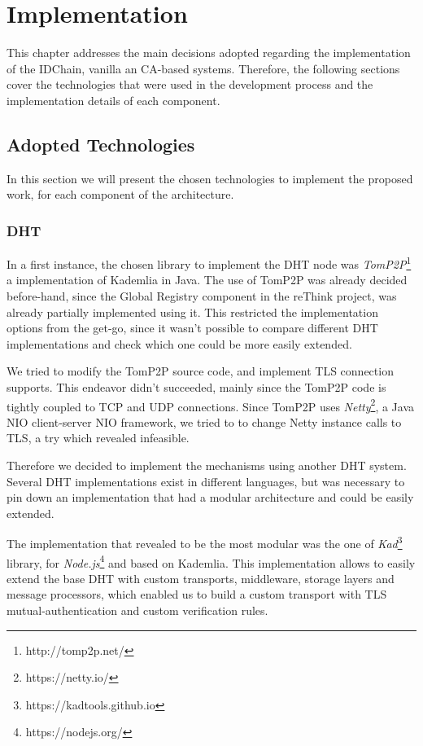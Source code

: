 \chapter{Implementation}
\label{chapter:implementation}

This chapter addresses the main decisions adopted regarding the implementation of the IDChain, vanilla an CA-based systems. Therefore, the following sections cover the technologies that were used in the development process and the implementation details of each component.

\section{Adopted Technologies}

In this section we will present the chosen technologies to implement the proposed work, for each component of the architecture.

\subsection{DHT}

In a first instance, the chosen library to implement the DHT node was \textit{TomP2P}\footnote{http://tomp2p.net/} a implementation of Kademlia in Java.
The use of TomP2P was already decided before-hand, since the Global Registry component in the reThink project, was already partially implemented using it.
This restricted the implementation options from the get-go, since it wasn't possible to compare different \ac{DHT} implementations and check which one could be more easily extended.

We tried to modify the TomP2P source code, and implement TLS connection supports.
This endeavor didn't succeeded, mainly since the TomP2P code is tightly coupled to TCP and UDP connections.
Since TomP2P uses \textit{Netty}\footnote{https://netty.io/}, a Java NIO client-server \ac{NIO} framework, we tried to to change Netty instance calls to TLS, a try which revealed infeasible.

Therefore we decided to implement the mechanisms using another DHT system.
Several DHT implementations exist in different languages, but was necessary to pin down an implementation that had a modular architecture and could be easily extended.

The implementation that revealed to be the most modular was the one of \textit{Kad}\footnote{https://kadtools.github.io} library, for \textit{Node.js}\footnote{https://nodejs.org/} and based on Kademlia.
This implementation allows to easily extend the base DHT with custom transports, middleware, storage layers and message processors, which enabled us to build a custom transport with TLS mutual-authentication and custom verification rules.

